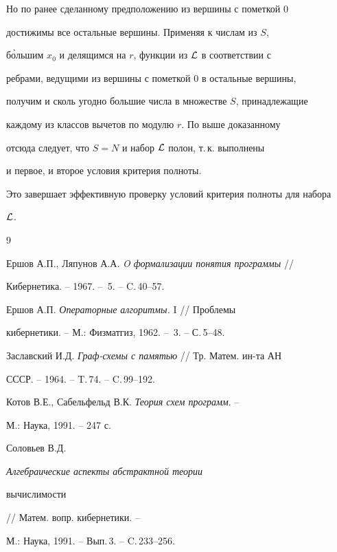 \begin{pf}
 


Но по ранее сделанному предположению из вершины с пометкой 0 


достижимы все остальные вершины. Применяя к числам из $S$, 


б\`ольшим $x_0$ и делящимся на $r$, функции из $\cal L$ в соответствии с 


ребрами, ведущими из вершины с пометкой 0 в остальные вершины, 


получим и сколь угодно большие числа в множестве $S$, принадлежащие 


каждому из классов вычетов по модулю $r$. По выше доказанному 


отсюда следует, что $S=N$ и набор $\cal L$ полон, т.\,к. выполнены 


и первое, и второе условия критерия полноты. 


 


Это завершает эффективную проверку условий критерия полноты для набора 


$\cal L$. 


\end{pf} 


 


\begin{thebibliography}{9} 


 




Ершов А.П., Ляпунов А.А. {\em O формализации понятия программы} // 


Кибернетика. -- 1967. -- \No\,5. -- C.\,40--57. 




Ершов А.П. {\em Операторные алгоритмы.} I // Проблемы 


кибернетики. -- М.: Физматгиз, 1962. -- \No\,3. -- С.\,5--48. 




Заславский И.Д. {\em Граф-схемы с памятью} // Тр. Матем. ин-та АН 


СССР. -- 1964. -- T.\,74. -- C.\,99--192. 




Котов В.Е., Сабельфельд В.К. {\em Теория схем программ}. -- 


М.: Наука, 1991. -- 247 с. 




Соловьев В.Д. {\em Алгебраические аспекты абстрактной теории 


вычислимости} // Матем. вопр. кибернетики. -- 


М.: Наука, 1991. -- Вып.\,3. -- C.\,233--256. 


 


\end{thebibliography} 


 


\vskip 2cm 


 






 


\label{end} 


 


